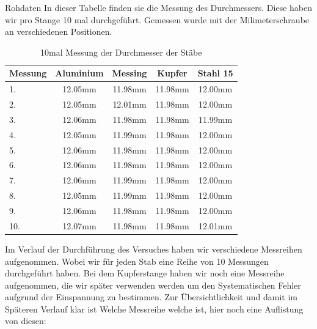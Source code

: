 \documentclass[twoside]{protokoll}
\begin{document}
\begin{aufgabe}{Rohdaten}
In dieser Tabelle finden sie die Messung des Durchmessers. Diese haben wir pro Stange 10 mal durchgeführt. Gemessen wurde mit der Milimeterschraube an verschiedenen Positionen.\\
    \begin{table}[H]
        \centering
        \begin{tabularx}{0.8\textwidth}{X c c c c} %
            \toprule
            \textbf{Messung} & \textbf{Aluminium} & \textbf{Messing} & \textbf{Kupfer} & \textbf{Stahl 15} \\
            \midrule
            1. & 12.05mm & 11.98mm & 11.98mm & 12.00mm \\
            2. & 12.05mm & 12.01mm & 11.98mm & 12.00mm \\
            3. & 12.06mm & 11.98mm & 11.98mm & 11.99mm \\
            4. & 12.05mm & 11.99mm & 11.98mm & 12.00mm \\
            5. & 12.06mm & 11.98mm & 11.98mm & 12.00mm \\
            6. & 12.06mm & 11.98mm & 11.98mm & 12.00mm \\
            7. & 12.06mm & 11.99mm & 11.98mm & 12.00mm \\
            8. & 12.05mm & 11.99mm & 11.98mm & 12.00mm \\
            9. & 12.06mm & 11.98mm & 11.98mm & 12.00mm \\
            10.& 12.07mm & 11.98mm & 11.98mm & 12.01mm \\
            \bottomrule
        \end{tabularx}
        \caption{10mal Messung der Durchmesser der Stäbe}
        \label{tab:mytable}
    \end{table}

Im Verlauf der Durchführung des Versuches haben wir verschiedene Messreihen aufgenommen. Wobei wir für jeden Stab eine Reihe von 10 Messungen durchgeführt haben. Bei dem Kupferstange haben wir noch eine Messreihe aufgenommen, die wir später verwenden werden um den Systematischen Fehler aufgrund der Einspannung zu bestimmen. Zur Übersichtlichkeit und damit im Späteren Verlauf klar ist Welche Messreihe welche ist, hier noch eine Auflistung von diesen:\\


\end{aufgabe}
\end{document}
